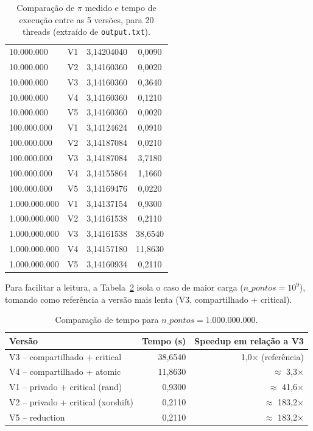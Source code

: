 \documentclass[a4paper,12pt]{article}
\begin{document}
\begin{table}[H]
\begin{tabular}{lccc}
10.000.000      & V1 & 3,14204040 & 0,0090 \\
10.000.000      & V2 & 3,14160360 & 0,0020 \\
10.000.000      & V3 & 3,14160360 & 0,3640 \\
10.000.000      & V4 & 3,14160360 & 0,1210 \\
10.000.000      & V5 & 3,14160360 & 0,0020 \\
\midrule

100.000.000     & V1 & 3,14124624 & 0,0910 \\
100.000.000     & V2 & 3,14187084 & 0,0210 \\
100.000.000     & V3 & 3,14187084 & 3,7180 \\
100.000.000     & V4 & 3,14155864 & 1,1660 \\
100.000.000     & V5 & 3,14169476 & 0,0220 \\
\midrule

1.000.000.000   & V1 & 3,14137154 & 0,9300 \\
1.000.000.000   & V2 & 3,14161538 & 0,2110 \\
1.000.000.000   & V3 & 3,14161538 & 38,6540 \\
1.000.000.000   & V4 & 3,14157180 & 11,8630 \\
1.000.000.000   & V5 & 3,14160934 & 0,2110 \\

\bottomrule
\end{tabular}
\caption{Comparação de $\pi$ medido e tempo de execução entre as 5 versões, para 20 threads (extraído de \texttt{output.txt}).}
\label{tab:resultados}
\end{table}

Para facilitar a leitura, a Tabela~\ref{tab:speedup} isola o caso de
maior carga ($n\_pontos = 10^9$), tomando como referência a versão
mais lenta (V3, compartilhado + critical).

\begin{table}[H]
\centering
\begin{tabular}{lrr}
\toprule
\textbf{Versão} & \textbf{Tempo (s)} & \textbf{Speedup em relação a V3} \\
\midrule
V3 -- compartilhado + critical & 38,6540 & 1,0$\times$ (referência) \\
V4 -- compartilhado + atomic   & 11,8630 & $\approx$ 3,3$\times$ \\
V1 -- privado + critical (rand) & 0,9300  & $\approx$ 41,6$\times$ \\
V2 -- privado + critical (xorshift) & 0,2110 & $\approx$ 183,2$\times$ \\
V5 -- reduction                & 0,2110  & $\approx$ 183,2$\times$ \\
\bottomrule
\end{tabular}
\caption{Comparação de tempo para $n\_pontos = 1.000.000.000$.}
\label{tab:speedup}
\end{table}
\end{document}
